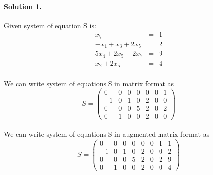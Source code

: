 \documentclass[11pt]{article}
\begin{document}
\pagestyle{myheadings}
\paragraph{Solution 1.} Given system of equation S is:
\begin{eqnarray*}
x_7&=&1
\\-x_1+x_3+2x_5&=&2
\\5x_4+2x_5+2x_7&=&9
\\x_2+2x_5&=&4
\end{eqnarray*}
\paragraph{}We can write system of equations S in matrix format as
\[
S=
  \begin{pmatrix}
  
    0 & 0 & 0 & 0 & 0 & 0 & 1  \\
    -1 & 0 & 1 & 0 & 2 & 0 & 0\\
    0 & 0 & 0 & 5 & 2 & 0 & 2\\
    0 & 1 & 0 & 0 & 2 & 0 & 0
  \end{pmatrix}
\]
\paragraph{} We can write system of equations S in augmented matrix format as
\[
S=
\left(\begin{array}{ccccccc|c}  
	0 & 0 & 0 & 0 & 0 & 0 & 1 & 1 \\
    -1 & 0 & 1 & 0 & 2 & 0 & 0 & 2\\
    0 & 0 & 0 & 5 & 2 & 0 & 2 & 9 \\
    0 & 1 & 0 & 0 & 2 & 0 & 0 & 4
\end{array}\right)
\]
\end{document}
